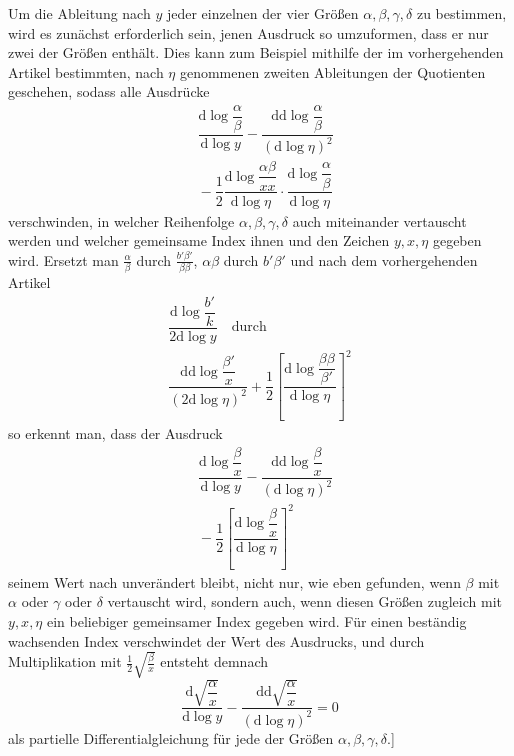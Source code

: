 Um die Ableitung nach $y$ jeder einzelnen der vier Größen $\alpha,\allowbreak \beta,\allowbreak \gamma,\allowbreak \delta$ zu bestimmen, wird es zunächst erforderlich sein, jenen Ausdruck so umzuformen, dass er nur zwei der Größen enthält. Dies kann zum Beispiel mithilfe der im vorhergehenden Artikel bestimmten, nach $\eta$ genommenen zweiten Ableitungen der Quotienten geschehen, sodass alle Ausdrücke
\[
\begin{aligned}&\dfrac{\mathrm d\log\dfrac{\alpha}{\beta}}{\mathrm d\log y}
-\dfrac{\mathrm d\mathrm d\log\dfrac{\alpha}{\beta}}{(\mathrm d\log\eta)^2}
\\[8pt]&{}-\dfrac12\dfrac{\mathrm d\log\dfrac{\alpha\beta}{xx}}{\mathrm d\log\eta}
\cdot\dfrac{\mathrm d\log\dfrac{\alpha}{\beta}}{\mathrm d\log\eta}\end{aligned}
\]
verschwinden, in welcher Reihenfolge $\alpha,\allowbreak \beta,\allowbreak \gamma,\allowbreak \delta$ auch miteinander vertauscht werden und welcher gemeinsame Index ihnen und den Zeichen $y,\allowbreak x,\allowbreak \eta$ gegeben wird. Ersetzt man $\frac{\alpha}{\beta}$ durch $\frac{b'\beta'}{\beta\beta}$, $\alpha\beta$ durch $b'\beta'$ und nach dem vorhergehenden Artikel
\[
\begin{gathered}\dfrac{\mathrm d\log\dfrac{b'}{k}}{2\mathrm d\log y}
\quad\text{durch}\\[9pt]
\dfrac{\mathrm d\mathrm d\log\dfrac{\beta'}{x}}{(2\mathrm d\log\eta)^2}
+\dfrac12\left[\dfrac{\mathrm d\log\dfrac{\beta\beta}{\beta'}}{\mathrm d\log\eta}\right]^2\end{gathered}
\]
so erkennt man, dass der Ausdruck
\[
\begin{aligned}&\dfrac{\mathrm d\log\dfrac{\beta}{x}}{\mathrm d\log y}
-\dfrac{\mathrm d\mathrm d\log\dfrac{\beta}{x}}{(\mathrm d\log\eta)^2}
\\[8pt]&{}-\dfrac12\left[\dfrac{\mathrm d\log\dfrac{\beta}{x}}{\mathrm d\log\eta}\right]^2\end{aligned}
\]
seinem Wert nach unverändert bleibt, nicht nur, wie eben gefunden, wenn $\beta$ mit $\alpha$ oder $\gamma$ oder $\delta$ vertauscht wird, sondern auch, wenn diesen Größen zugleich mit $y,\allowbreak x,\allowbreak \eta$ ein beliebiger gemeinsamer Index gegeben wird. Für einen beständig wachsenden Index verschwindet der Wert des Ausdrucks, und durch Multiplikation mit $\frac12\surd {\frac{\beta}{x}}$ entsteht demnach
\[
\dfrac{\mathrm d\surd {\dfrac{\alpha}{x}}}{\mathrm d\log y}
-\dfrac{\mathrm d\mathrm d\surd {\dfrac{\alpha}{x}}}{(\mathrm d\log\eta)^2}=0
\]
als partielle Differentialgleichung für jede der Größen $\alpha,\allowbreak \beta,\allowbreak \gamma,\allowbreak \delta$.]

